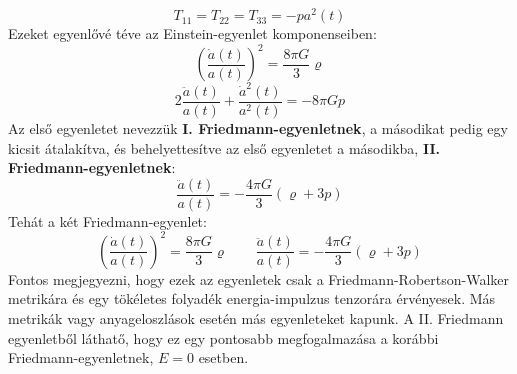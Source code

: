 \documentclass[../main.tex]{subfiles}
\begin{document}
\begin{equation}
    T_{11} = T_{22} = T_{33} = - p a^2(t)
\end{equation}
Ezeket egyenlővé téve az Einstein-egyenlet komponenseiben:
\begin{equation}
    \left(\frac{\dot{a}(t)}{a(t)}\right)^2 = \frac{8 \pi G}{3} \varrho
\end{equation}
\begin{equation}
    2 \frac{\ddot{a}(t)}{a(t)} + \frac{\dot{a}^2(t)}{a^2(t)} = - 8 \pi G p
\end{equation}
Az első egyenletet nevezzük \textbf{I. Friedmann-egyenletnek}, a másodikat pedig egy kicsit átalakítva, és behelyettesítve az első egyenletet a másodikba, \textbf{II. Friedmann-egyenletnek}:
\begin{equation}
    \frac{\ddot{a}(t)}{a(t)} = - \frac{4 \pi G}{3} (\varrho + 3 p)
\end{equation}
Tehát a két Friedmann-egyenlet:
\begin{equation}
    \boxed{\left(\frac{\dot{a}(t)}{a(t)}\right)^2 = \frac{8 \pi G}{3} \varrho \qquad \frac{\ddot{a}(t)}{a(t)} = - \frac{4 \pi G}{3} (\varrho + 3 p)}
\end{equation}
Fontos megjegyezni, hogy ezek az egyenletek csak a Friedmann-Robertson-Walker metrikára és egy tökéletes folyadék energia-impulzus tenzorára érvényesek. Más metrikák vagy anyageloszlások esetén
más egyenleteket kapunk. A II. Friedmann egyenletből láthatő, hogy ez egy pontosabb megfogalmazása a korábbi Friedmann-egyenletnek, $E = 0$ esetben.
\end{document}
